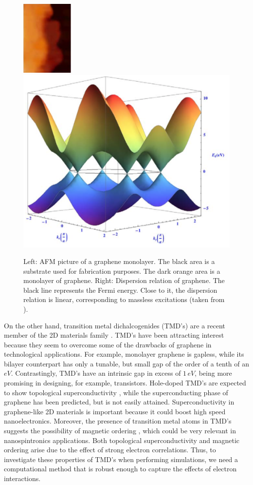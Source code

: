 \documentclass[10pt, twocolumn, twoside]{article}
\begin{document}
\begin{figure}[ht!]
\centering
\includegraphics[width = 2.6cm]{graphene.png}
\hspace{0.65cm}
\includegraphics[width =4.5 cm]{disp_rel.png}
\caption{Left: AFM picture of a graphene monolayer. The black area is a substrate used for fabrication purposes. The dark orange area is a monolayer of graphene. Right: Dispersion relation of graphene. The black line represents the Fermi energy. Close to it, the dispersion relation is linear, corresponding to massless excitations (taken from \cite{graphene_nobel}). \label{fig:graphene}}
\end{figure}	

On the other hand, transition metal dichalcogenides (TMD's) are a recent member of the 2D materials family \cite{tmd_family1, tmd_family2, tmd_family3}. TMD's have been attracting interest because they seem to overcome some of the drawbacks of graphene in technological applications. For example, monolayer graphene is gapless, while its bilayer counterpart has only a tunable, but small gap of the order of a tenth of an $eV$. Contrastingly, TMD's have an intrinsic gap in excess of $1 \, eV$, being more promising in designing, for example, transistors. Hole-doped TMD's are expected to show topological superconductivity \cite{topological}, while the superconducting phase of graphene has been predicted, but is not easily attained. Superconductivity in graphene-like 2D materials is important because it could boost high speed nanoelectronics. Moreover, the presence of transition metal atoms in TMD's suggests the possibility of magnetic ordering \cite{tmd_magnetism}, which could be very relevant in nanospintronics applications. Both topological superconductivity and magnetic ordering arise due to the effect of strong electron correlations. Thus, to investigate these properties of TMD's when performing simulations, we need a computational method that is robust enough to capture the effects of electron interactions.\par
\end{document}
